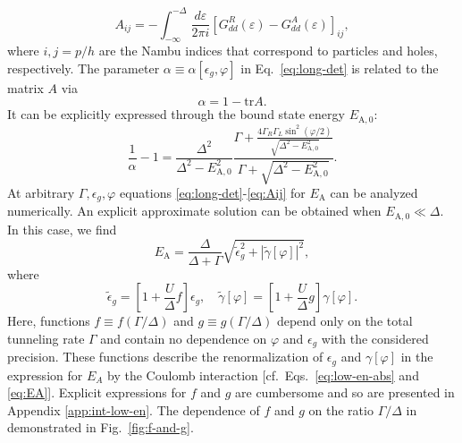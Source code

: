 \documentclass[aps,reprint,longbibliography, prb]{revtex4-2}
\begin{document}
\begin{equation}
    \label{eq:Aij}
    A_{ij} = - \int_{-\infty}^{-\Delta} \frac{d\varepsilon}{2 \pi i} \left[G_{dd}^R(\varepsilon) - G_{dd}^A(\varepsilon)\right]_{ij},
\end{equation}
where $i,j = p/h$ are the Nambu indices that correspond to particles and holes, respectively. The parameter $\alpha \equiv \alpha[\epsilon_g, \varphi] $ in Eq.~\eqref{eq:long-det} is related to the matrix $A$ via
\begin{equation}\label{eq:alpha_int}
\alpha = 1 - \mathrm{tr}A.
\end{equation}
It can be explicitly expressed through the bound state energy $E_\mathrm{A,0}$:
\begin{equation}
\label{eq:alpha}
    \frac{1}{\alpha} - 1= \frac{\Delta^2}{\Delta^2 - E_{\mathrm{A,0}}^2}\frac{\Gamma + \frac{4\Gamma_R\Gamma_L \sin^2(\varphi/2)}{\sqrt{\Delta^2 - E_{\mathrm{A,0}}^2}}}{\Gamma + \sqrt{\Delta^2 - E_{\mathrm{A,0}}^2}}.
\end{equation}
At arbitrary $\Gamma, \epsilon_g,\varphi$ equations \eqref{eq:long-det}-\eqref{eq:Aij} for $E_\mathrm{A}$ can be analyzed numerically. An explicit approximate solution can be obtained when $E_\mathrm{A,0}\ll\Delta$. In this case, we find
\begin{equation}
    \label{eq:EA}
    E_{\mathrm{A}} = \frac{\Delta}{\Delta + \Gamma}\sqrt{\tilde{\epsilon}_g^2 + |\tilde{\gamma}[\varphi]|^2},
\end{equation}
where
\begin{equation}
\label{eq:renorm}
    \tilde{\epsilon}_g = \left[1+\frac{U}{\Delta}f\right] \epsilon_g,\quad \tilde{\gamma}[\varphi] =  \left[1+\frac{U}{\Delta}g\right] \gamma[\varphi].
\end{equation}
Here, functions $f \equiv f(\Gamma/\Delta)$ and $g \equiv g(\Gamma/\Delta)$ depend only on the total tunneling rate $\Gamma$ and contain no dependence on $\varphi$ and $\epsilon_g$ with the considered precision. These functions describe the renormalization of $\epsilon_g$ and $\gamma[\varphi]$ in the expression for $E_A$ by the Coulomb interaction [cf.~Eqs.~\eqref{eq:low-en-abs} and \eqref{eq:EA}].
Explicit expressions for $f$ and $g$ are cumbersome and so are presented in Appendix \ref{app:int-low-en}.
The dependence of $f$ and $g$ on the ratio $\Gamma/\Delta$ in demonstrated in Fig.~\ref{fig:f-and-g}.
\end{document}
